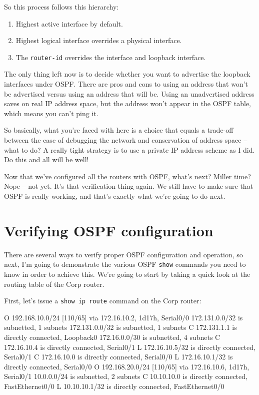 So this process follows this hierarchy:

\begin{enumerate}
\item
  Highest active interface by default.
\item
  Highest logical interface overrides a physical interface.
\item
  The \texttt{router-id} overrides the interface and loopback interface.
\end{enumerate}

The only thing left now is to decide whether you want to advertise the
loopback interfaces under OSPF. There are pros and cons to using an
address that won't be advertised versus using an address that will be.
Using an unadvertised address saves on real IP address space, but the
address won't appear in the OSPF table, which means you can't ping it.

So basically, what you're faced with here is a choice that equals a
trade-off between the ease of debugging the network and conservation of
address space -- what to do? A really tight strategy is to use a private
IP address scheme as I did. Do this and all will be well!

Now that we've configured all the routers with OSPF, what's next? Miller
time? Nope -- not yet. It's that verification thing again. We still have
to make sure that OSPF is really working, and that's exactly what we're
going to do next.




\section{Verifying OSPF configuration}

There are several ways to verify proper OSPF configuration and
operation, so next, I'm going to demonstrate the various OSPF
\texttt{show} commands you need to know in order to achieve this. We're
going to start by taking a quick look at the routing table of the Corp
router.

First, let's issue a \texttt{show\ ip\ route} command on the Corp
router:

\begin{cli}
O    192.168.10.0/24 [110/65] via 172.16.10.2, 1d17h, Serial0/0
     172.131.0.0/32 is subnetted, 1 subnets
    172.131.0.0/32 is subnetted, 1 subnets
C        172.131.1.1 is directly connected, Loopback0
     172.16.0.0/30 is subnetted, 4 subnets
C       172.16.10.4 is directly connected, Serial0/1
L       172.16.10.5/32 is directly connected, Serial0/1
C       172.16.10.0 is directly connected, Serial0/0
L       172.16.10.1/32 is directly connected, Serial0/0
O    192.168.20.0/24 [110/65] via 172.16.10.6, 1d17h, Serial0/1
     10.0.0.0/24 is subnetted, 2 subnets
C       10.10.10.0 is directly connected, FastEthernet0/0
L       10.10.10.1/32 is directly connected, FastEthernet0/0
\end{cli}

